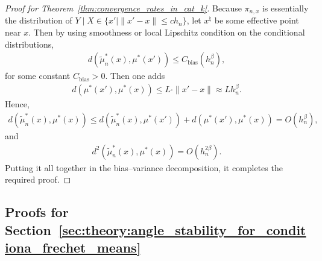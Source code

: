 \begin{proof}[Proof for Theorem~\ref{thm:convergence_rates_in_cat_k}]
    Because $\pi_{n,x}$ is essentially the distribution of $Y \mid X \in \{x' \mid \|x' - x\| \leq c h_n\}$, let $x^\natural$ be some effective point near $x$.
    Then by using smoothness or local Lipschitz condition on the conditional distributions, 
    \begin{align*}
        d(\tilde{\mu}^*_n(x), \mu^*(x')) \leq C_{\mathrm{bias}}(h^\beta_n),
    \end{align*}
    for some constant $C_{\mathrm{bias}} > 0$.
    Then one adds
    \begin{align*}
        d(\mu^*(x'), \mu^*(x)) \leq L \cdot \|x' - x\| \approx L h_n^\beta.
    \end{align*}
    Hence,
    \begin{align*}
        d(\tilde{\mu}^*_n(x), \mu^*(x)) \leq d(\tilde{\mu}^*_n(x), \mu^*(x')) + d(\mu^*(x'), \mu^*(x)) = O(h_n^\beta),
    \end{align*}
    and
    \begin{align*}
        d^2(\tilde{\mu}^*_n(x), \mu^*(x)) = O(h_n^{2\beta}).
    \end{align*}
    Putting it all together in the bias–variance decomposition, it completes the required proof.
\end{proof}

\clearpage
\subsection{Proofs for Section~\ref{sec:theory:angle_stability_for_conditiona_frechet_means}}

